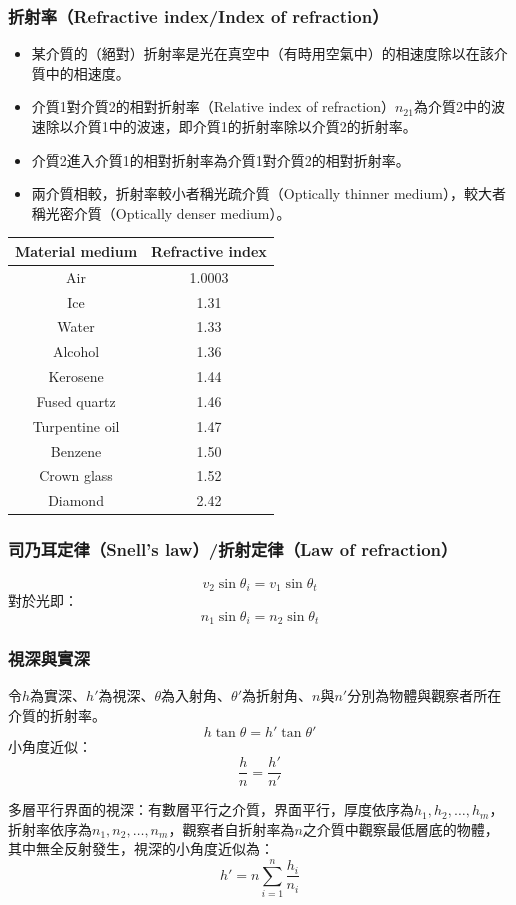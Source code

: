 \documentclass[a4paper,12pt]{report}
\begin{document}
\subsubsection{折射率（Refractive index/Index of refraction）}
\begin{itemize}
\item 某介質的（絕對）折射率是光在真空中（有時用空氣中）的相速度除以在該介質中的相速度。
\item 介質1對介質2的相對折射率（Relative index of refraction）$n_{21}$為介質2中的波速除以介質1中的波速，即介質1的折射率除以介質2的折射率。
\item 介質2進入介質1的相對折射率為介質1對介質2的相對折射率。
\item 兩介質相較，折射率較小者稱光疏介質（Optically thinner medium），較大者稱光密介質（Optically denser medium）。
\end{itemize}
\begin{longtable}{|c|c|}
\hline
Material medium & Refractive index\\\hline\endhead
Air & 1.0003\\\hline
Ice & 1.31\\\hline
Water & 1.33\\\hline
Alcohol & 1.36\\\hline
Kerosene & 1.44\\\hline
Fused quartz & 1.46\\\hline
Turpentine oil & 1.47\\\hline
Benzene & 1.50\\\hline
Crown glass & 1.52\\\hline
Diamond & 2.42\\\hline
\end{longtable}
\FB
\subsubsection{司乃耳定律（Snell's law）/折射定律（Law of refraction）}
\[v_2 \sin \theta_i = v_1 \sin \theta_t \]
對於光即：
\[n_1 \sin \theta_i = n_2 \sin \theta_t \]
\subsubsection{視深與實深}
令$h$為實深、$h'$為視深、$\theta$為入射角、$\theta'$為折射角、$n$與$n'$分別為物體與觀察者所在介質的折射率。
\[h\tan\theta=h'\tan\theta'\]
小角度近似：
\[\frac{h}{n}=\frac{h'}{n'}\]

多層平行界面的視深：有數層平行之介質，界面平行，厚度依序為$h_1, h_2, \ldots, h_m$，折射率依序為$n_1, n_2, \ldots, n_m$，觀察者自折射率為$n$之介質中觀察最低層底的物體，其中無全反射發生，視深的小角度近似為：
\[h'=n\sum_{i=1}^n\frac{h_i}{n_i}\]
\end{document}
